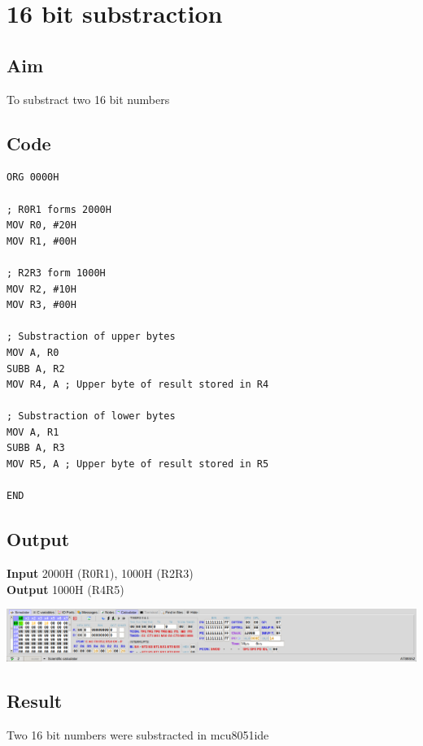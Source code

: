 \section{16 bit substraction}
\subsection{Aim}
To substract two 16 bit numbers

\subsection{Code}
\begin{lstlisting}
ORG 0000H

; R0R1 forms 2000H
MOV R0, #20H
MOV R1, #00H

; R2R3 form 1000H
MOV R2, #10H
MOV R3, #00H

; Substraction of upper bytes
MOV A, R0
SUBB A, R2
MOV R4, A ; Upper byte of result stored in R4

; Substraction of lower bytes
MOV A, R1
SUBB A, R3
MOV R5, A ; Upper byte of result stored in R5

END
\end{lstlisting}

\subsection{Output}
\textbf{Input} 2000H (R0R1), 1000H (R2R3)\\
\textbf{Output} 1000H (R4R5)
\begin{center}
	\includegraphics[width=\textwidth]{img/p22.png}
\end{center}

\subsection{Result}
Two 16 bit numbers were substracted in mcu8051ide

